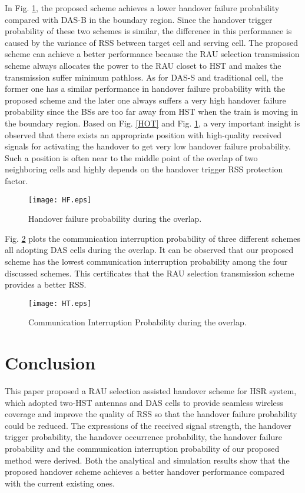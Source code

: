 \documentclass[a4paper,twocolumn,10pt]{IEEEtran}
\newcommand{\picspacec}{{\vspace{-0.1 in}}}
\begin{document}
In Fig. \ref{HF}, the proposed scheme achieves a lower handover failure probability compared with DAS-B in the boundary region. Since the handover trigger probability of these two schemes is similar, the difference in this performance is caused by the variance of RSS between target cell and serving cell. The proposed scheme can achieve a better performance because the RAU selection transmission scheme always allocates the power to the RAU closet to HST and makes the transmission suffer minimum pathloss. As for DAS-S and traditional cell, the former one has a similar performance in handover failure probability with the proposed scheme and the later one always suffers a very high handover failure probability since the BSs are too far away from HST when the train is moving in the boundary region. Based on Fig. \ref{HOT} and Fig. \ref{HF}, a very important insight is observed that there exists an appropriate position with high-quality received signals for activating the handover to get very low handover failure probability. Such a position is often near to the middle point of the overlap of two neighboring cells and highly depends on the handover trigger RSS protection factor.


\begin{figure}
\centering
\texttt{[image: HF.eps]}
\caption{Handover failure probability during the overlap.}
\label{HF}\picspacec
\end{figure}



Fig. \ref{HT} plots the communication interruption probability of three different schemes all adopting DAS cells during the overlap. It can be observed that our proposed scheme has the lowest communication interruption probability among the four discussed schemes.  This certificates that the RAU selection transmission scheme provides a better RSS.


\begin{figure}
\centering
\texttt{[image: HT.eps]}
\caption{Communication Interruption Probability during the overlap.}
\label{HT}\picspacec
\end{figure}

\section{Conclusion}
This paper proposed a RAU selection assisted handover scheme for HSR system, which adopted two-HST antennas and DAS cells to provide seamless wireless coverage and improve the quality of RSS so that the handover failure probability could be reduced. The expressions of the received signal strength, the handover trigger probability, the handover occurrence probability, the handover failure probability and the communication interruption probability of our proposed method were derived. Both the analytical and simulation results show that the proposed handover scheme achieves a better handover performance compared with the current existing ones.
\end{document}
